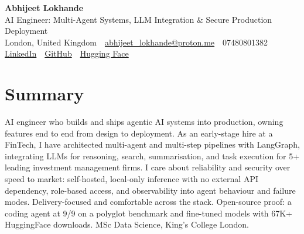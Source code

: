 \documentclass[10pt,a4paper]{article}
\newcommand{\sep}{\,\textcolor{accent!60}{\textbar}\,}
\begin{document}
\begin{center}
  {\fontsize{24}{26}\selectfont\bfseries Abhijeet Lokhande}\\[3pt]
  {\color{accent}\large AI Engineer: Multi-Agent Systems, LLM Integration \& Secure Production Deployment}\\[5pt]
  {\small
    London, United Kingdom \sep
    \href{mailto:abhijeet_lokhande@proton.me}{abhijeet\_lokhande@proton.me} \sep
    07480801382 \\[2pt]
    \href{https://www.linkedin.com/in/ablds/}{LinkedIn} \sep
    \href{https://github.com/abhijeetscode}{GitHub} \sep
    \href{https://huggingface.co/ab-ai}{Hugging Face}
  }
\end{center}
\vspace{2pt}

\section{Summary}
AI engineer who builds and ships agentic AI systems into production, owning features end to end from design to deployment. As an early-stage hire at a FinTech, I have architected multi-agent and multi-step pipelines with LangGraph, integrating LLMs for reasoning, search, summarisation, and task execution for 5+ leading investment management firms. I care about reliability and security over speed to market: self-hosted, local-only inference with no external API dependency, role-based access, and observability into agent behaviour and failure modes. Delivery-focused and comfortable across the stack. Open-source proof: a coding agent at 9/9 on a polyglot benchmark and fine-tuned models with 67K+ HuggingFace downloads. MSc Data Science, King's College London.

\end{document}
